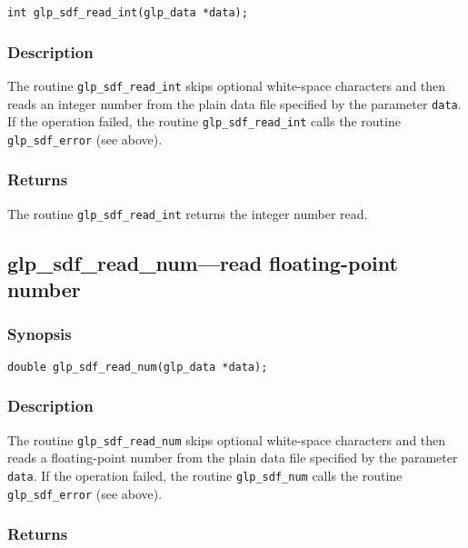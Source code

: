 \begin{verbatim}
int glp_sdf_read_int(glp_data *data);
\end{verbatim}

\subsubsection*{Description}

The routine \verb|glp_sdf_read_int| skips optional white-space
characters and then reads an integer number from the plain data file
specified by the parameter \verb|data|. If the operation failed, the
routine \verb|glp_sdf_read_int| calls the routine \verb|glp_sdf_error|
(see above).

\subsubsection*{Returns}

The routine \verb|glp_sdf_read_int| returns the integer number read.

\newpage

\subsection{glp\_sdf\_read\_num---read floating-point number}

\subsubsection*{Synopsis}

\begin{verbatim}
double glp_sdf_read_num(glp_data *data);
\end{verbatim}

\subsubsection*{Description}

The routine \verb|glp_sdf_read_num| skips optional white-space
characters and then reads a floating-point number from the plain data
file specified by the parameter \verb|data|. If the operation failed,
the routine \verb|glp_sdf_num| calls the routine \verb|glp_sdf_error|
(see above).

\subsubsection*{Returns}

